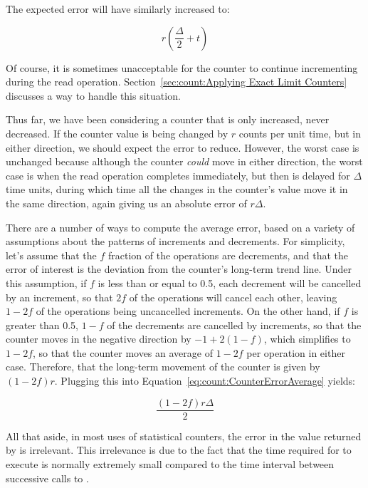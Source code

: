 {	The expected error will have similarly increased to:

	\begin{equation}
		r \left( \frac{\Delta}{2} + t \right)
	\end{equation}

	Of course, it is sometimes unacceptable for the counter to
	continue incrementing during the read operation.
	Section~\ref{sec:count:Applying Exact Limit Counters}
	discusses a way to handle this situation.

	Thus far, we have been considering a counter that is only
	increased, never decreased.
	If the counter value is being changed by $r$ counts per unit
	time, but in either direction, we should expect the error
	to reduce.
	However, the worst case is unchanged because although the
	counter \emph{could} move in either direction, the worst
	case is when the read operation completes immediately,
	but then is delayed for $\Delta$ time units, during which
	time all the changes in the counter's value move it in
	the same direction, again giving us an absolute error
	of $r \Delta$.

	There are a number of ways to compute the average error,
	based on a variety of assumptions about the patterns of
	increments and decrements.
	For simplicity, let's assume that the $f$ fraction of
	the operations are decrements, and that the error of interest
	is the deviation from the counter's long-term trend line.
	Under this assumption, if $f$ is less than or equal to 0.5,
	each decrement will be cancelled by an increment, so that
	$2f$ of the operations will cancel each other, leaving
	$1-2f$ of the operations being uncancelled increments.
	On the other hand, if $f$ is greater than 0.5, $1-f$ of
	the decrements are cancelled by increments, so that the
	counter moves in the negative direction by $-1+2\left(1-f\right)$,
	which simplifies to $1-2f$, so that the counter moves an average
	of $1-2f$ per operation in either case.
	Therefore, that the long-term
	movement of the counter is given by $\left( 1-2f \right) r$.
	Plugging this into
	Equation~\ref{eq:count:CounterErrorAverage} yields:

	\begin{equation}
		\frac{\left( 1 - 2 f \right) r \Delta}{2}
	\end{equation}

	All that aside, in most uses of statistical counters, the
	error in the value returned by  is
	irrelevant.
	This irrelevance is due to the fact that the time required
	for  to execute is normally extremely
	small compared to the time interval between successive
	calls to .
} \QuickQuizEnd

